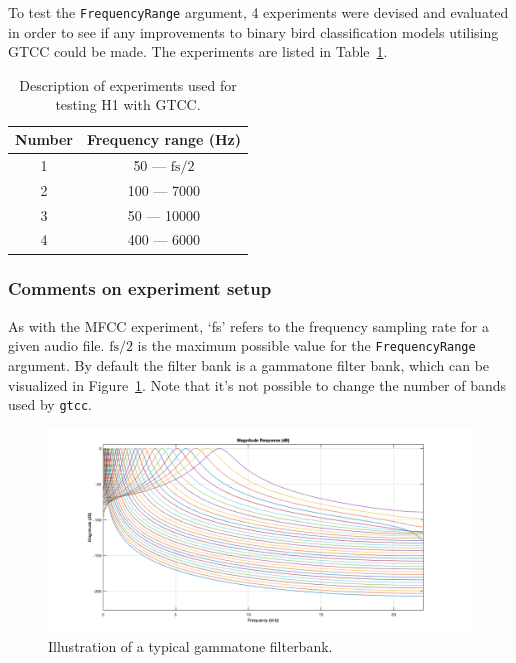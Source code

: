 To test the \texttt{FrequencyRange} argument, 4 experiments were devised and
evaluated in order to see if any improvements to binary bird classification
models utilising GTCC could be made. The experiments are listed in
Table~\ref{table:h1_gtcc_experiments}.

\begin{table}[ht]
\begin{center}
\begin{tabular}{c c}
\toprule
Number & Frequency range (Hz) \\ [0.5ex]
\midrule
1 & 50 --- $\text{fs}/2$ \\
2 & 100 --- 7000 \\
3 & 50 --- 10000 \\
4 & 400 --- 6000 \\
\bottomrule
\end{tabular}
\caption{Description of experiments used for testing H1 with
GTCC.}\label{table:h1_gtcc_experiments}
\end{center}
\end{table}

\subsubsection{Comments on experiment setup}

As with the MFCC experiment, `fs' refers to the frequency sampling rate for a
given audio file. $\text{fs}/2$ is the maximum possible value for the
\texttt{FrequencyRange} argument. By default the filter bank is a gammatone
filter bank, which can be visualized in Figure~\ref{fig:gammatone_filterbank}.
Note that it's not possible to change the number of bands used by \texttt{gtcc}.

\begin{figure}[ht]
  \centering
  \includegraphics[width=\textwidth]{figures/gammatone_filterbank.png}
  \caption{Illustration of a typical gammatone
  filterbank.}\label{fig:gammatone_filterbank}
\end{figure}

